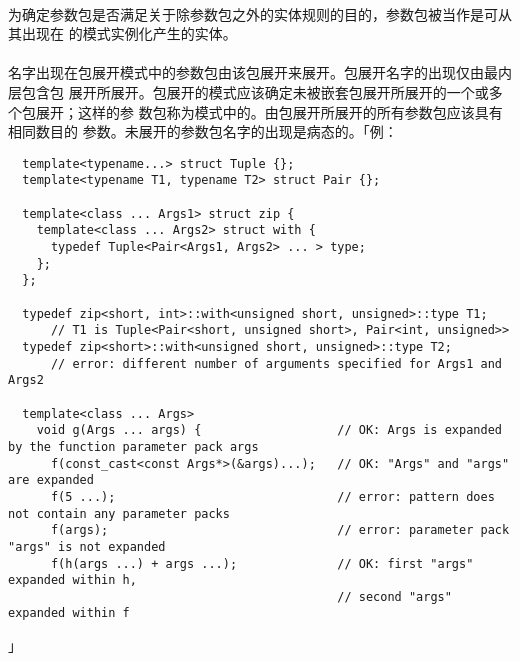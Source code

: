 \paragraph{}
为确定参数包是否满足关于除参数包之外的实体规则的目的，参数包被当作是可从其出现在
的模式实例化产生的实体。

\paragraph{}
名字出现在包展开模式中的参数包由该包展开来展开。包展开名字的出现仅由最内层包含包
展开所展开。包展开的模式应该确定未被嵌套包展开所展开的一个或多个包展开；这样的参
数包称为模式中的。由包展开所展开的所有参数包应该具有相同数目的
参数。未展开的参数包名字的出现是病态的。「例：
\begin{lstlisting}
  template<typename...> struct Tuple {};
  template<typename T1, typename T2> struct Pair {};

  template<class ... Args1> struct zip {
    template<class ... Args2> struct with {
      typedef Tuple<Pair<Args1, Args2> ... > type;
    };
  };

  typedef zip<short, int>::with<unsigned short, unsigned>::type T1;
      // T1 is Tuple<Pair<short, unsigned short>, Pair<int, unsigned>>
  typedef zip<short>::with<unsigned short, unsigned>::type T2;
      // error: different number of arguments specified for Args1 and Args2

  template<class ... Args>
    void g(Args ... args) {                   // OK: Args is expanded by the function parameter pack args
      f(const_cast<const Args*>(&args)...);   // OK: "Args" and "args" are expanded
      f(5 ...);                               // error: pattern does not contain any parameter packs
      f(args);                                // error: parameter pack "args" is not expanded
      f(h(args ...) + args ...);              // OK: first "args" expanded within h,
                                              // second "args" expanded within f
\end{lstlisting}」

